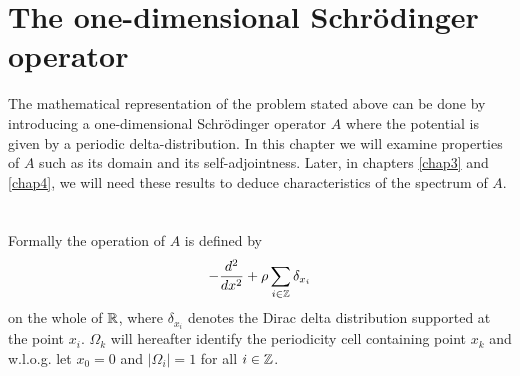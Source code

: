 \chapter{The one-dimensional Schrödinger operator} \label{chap2}

The mathematical representation of the problem stated above can be done by introducing a one-dimensional Schrödinger operator $A$ where the potential is given by a periodic delta-distribution. In this chapter we will examine properties of $A$ such as its domain and its self-adjointness. Later, in chapters \ref{chap3} and \ref{chap4}, we will need these results to deduce characteristics of the spectrum of $A$. ~\\ ~\\
Formally the operation of $A$ is defined by
\begin{equation}
	- \frac{d^{2}}{dx^{2}} + \rho \sum_{i \in \mathbb{Z}} \delta_{x_{i}} \label{the-operator-A-formally}
\end{equation}
on the whole of $\mathbb{R}$, where $\delta_{x_{i}}$ denotes the Dirac delta distribution supported at the point $x_{i}$. $\Omega_{k}$ will hereafter identify the periodicity cell containing point $x_{k}$ and w.l.o.g. let $x_{0} = 0$ and $|\Omega_{i}| = 1$ for all $i \in \mathbb{Z}$.
~\\  

